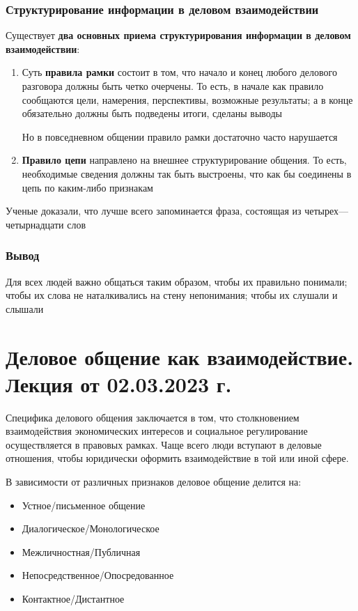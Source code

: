 \subsubsection{Структурирование информации в деловом взаимодействии}

Существует \textbf{два основных приема структурирования информации в деловом взаимодействии}:

\begin{enumerate}
    \item Суть \textbf{правила рамки} состоит в том, что начало и конец любого делового разговора должны быть четко очерчены. То есть, в начале как правило сообщаются цели, намерения, перспективы, возможные результаты; а в конце обязательно должны быть подведены итоги, сделаны выводы

    Но в повседневном общении правило рамки достаточно часто нарушается
    \item \textbf{Правило цепи} направлено на внешнее структурирование общения. То есть, необходимые сведения должны так быть выстроены, что как бы соединены в цепь по каким-либо признакам
\end{enumerate}
    
Ученые доказали, что лучше всего запоминается фраза, состоящая из четырех—четырнадцати слов

\subsubsection{Вывод}

Для всех людей важно общаться таким образом, чтобы их правильно понимали; чтобы их слова не наталкивались на стену непонимания; чтобы их слушали и слышали

\section{Деловое общение как взаимодействие. Лекция от 02.03.2023 г.}

Специфика делового общения заключается в том, что столкновением взаимодействия экономических интересов и социальное регулирование осуществляется в правовых рамках. Чаще всего люди вступают в деловые отношения, чтобы юридически оформить взаимодействие в той или иной сфере.

В зависимости от различных признаков деловое общение делится на:
\begin{itemize}
    \item Устное/письменное общение
    \item Диалогическое/Монологическое
    \item Межличностная/Публичная
    \item Непосредственное/Опосредованное
    \item Контактное/Дистантное
\end{itemize}

